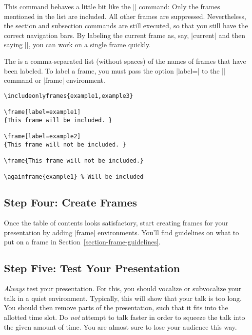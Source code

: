 \begin{command}{{}}
  This command behaves a little bit like the || command: Only the frames mentioned in the list are included. All other frames are suppressed. Nevertheless, the section and subsection commands are still executed, so that you still have the correct navigation bars. By labeling the current frame as, say, |current| and then saying ||, you can work on a single frame quickly.

  The  is a comma-separated list (without spaces) of the names of frames that have been labeled. To label a frame, you must pass the option |label=| to the |\frame| command or |frame| environment.

  \example
\begin{verbatim}
\includeonlyframes{example1,example3}

\frame[label=example1]
{This frame will be included. }

\frame[label=example2]
{This frame will not be included. }

\frame{This frame will not be included.}

\againframe{example1} % Will be included
\end{verbatim}
\end{command}


\subsection{Step Four: Create Frames}

Once the table of contents looks satisfactory, start creating frames for your presentation by adding |frame| environments. You'll find guidelines on what to put on a frame in Section~\ref{section-frame-guidelines}.


\subsection{Step Five: Test Your Presentation}

\emph{Always} test your presentation. For this, you should vocalize or subvocalize your talk in a quiet environment. Typically, this will show that your talk is too long. You should then remove parts of the presentation, such that it fits into the allotted time slot. Do \emph{not} attempt to talk faster in order to squeeze the talk into the given amount of time. You are almost sure to lose your audience this way.

